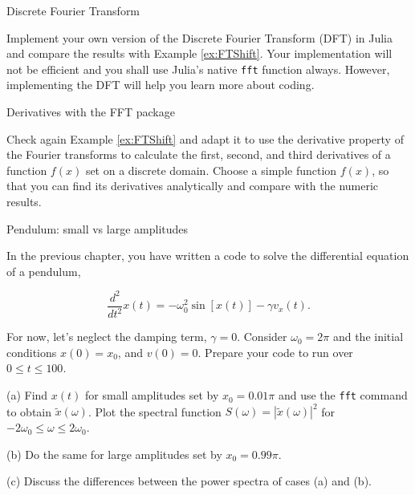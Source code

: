 \begin{problem}{Discrete Fourier Transform}
  \label{prob:DFT}

  Implement your own version of the Discrete Fourier Transform (DFT) in Julia and compare the results with Example \ref{ex:FTShift}. Your implementation will not be efficient and you shall use Julia's native \texttt{fft} function always. However, implementing the DFT will help you learn more about coding.

\end{problem}

\begin{problem}{Derivatives with the FFT package}
  \label{prob:FFTdiff}
  
  Check again Example \ref{ex:FTShift} and adapt it to use the derivative property of the Fourier transforms to calculate the first, second, and third derivatives of a function $f(x)$ set on a discrete domain. Choose a simple function $f(x)$, so that you can find its derivatives analytically and compare with the numeric results.  
 
\end{problem}

\begin{problem}{Pendulum: small vs large amplitudes}
 \label{prob:FFTpendulum}
 
 In the previous chapter, you have written a code to solve the differential equation of a pendulum,
 
 \begin{equation}
   \dfrac{d^2}{dt^2} x(t) = -\omega_0^2 \sin[x(t)] -\gamma v_x(t).
  \end{equation}
 
 For now, let's neglect the damping term, $\gamma = 0$. Consider $\omega_0 = 2\pi$ and the initial conditions $x(0) = x_0$, and $v(0) = 0$. Prepare your code to run over $0 \leq t \leq 100$.
 
 (a) Find $x(t)$ for small amplitudes set by $x_0 = 0.01\pi$ and use the \texttt{fft} command to obtain $\tilde{x}(\omega)$. Plot the spectral function $S(\omega) = |\tilde{x}(\omega)|^2$ for $-2\omega_0 \leq \omega \leq 2\omega_0$.

 (b) Do the same for large amplitudes set by $x_0 = 0.99\pi$.
 
 (c) Discuss the differences between the power spectra of cases (a) and (b).
 
\end{problem}


